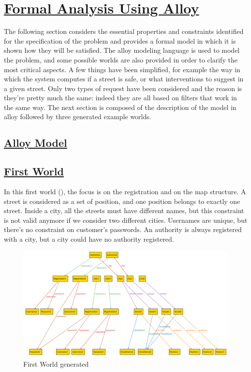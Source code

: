 \section[Formal Analysis Using Alloy]{\hyperlink{toc}{Formal Analysis Using Alloy}}
	\label{sec:formalAnalysisUsingAlloy}
	The following section considers the essential properties and constraints identified for the specification of the problem and provides a formal model in which it is shown how they will be satisfied. The alloy modeling language is used to model the problem, and some possible worlds are also provided in order to clarify the most critical aspects. 
	A few things have been simplified, for example the way in which the system computes if a street is safe, or what interventions to suggest in a given street. Only two types of request have been considered and the reason is they're pretty much the same: indeed they are all based on filters that work in the same way. The next section is composed of the description of the model in alloy followed by three generated example worlds.
	
	\subsection[Alloy Model]{\hyperlink{toc}{Alloy Model}}
	
	
	\subsection[First World]{\hyperlink{toc}{First World}}
	In this first world (), the focus is on the registration and on the map structure. 
	A street is considered as a set of position, and one position belongs to exactly one street. Inside a city, all the streets must have different names, but this constraint is not valid anymore if we consider two different cities.
	Usernames are unique, but there's no constraint on customer's passwords.
	An authority is always registered with a city, but a city could have no authority registered.
	
	\begin{figure}[h!]
		\centering
		\includegraphics[scale=0.4, angle=90]{Files/alloy/world1.png}
		\caption{\label{fig:firstWorld}First World generated}
	\end{figure}
	
